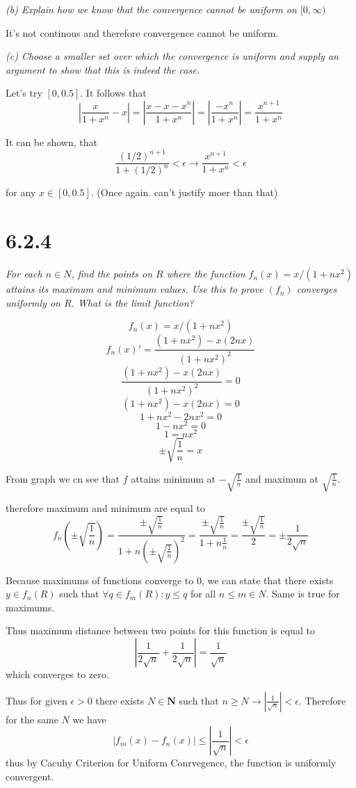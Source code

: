 \documentclass[11pt,oneside,titlepage]{book}
\begin{document}
\textit{(b) Explain how we know that the convergence cannot be uniform
  on $[0, \infty)$}

It's not continous and therefore convergence cannot be uniform.

\textit{(c) Choose a smaller set over which the convergence is uniform and
  supply an argument to show that this is indeed the case.}

Let's try $[0, 0.5]$. It follows that
$$\left|\frac{x}{1 + x^n} - x\right|  =
\left|\frac{x - x - x^n}{1 + x^n}\right|  =
\left|\frac{ - x^n}{1 + x^n}\right|  =
\frac{ x^{n + 1}}{1 + x^n} 
$$

It can be shown, that
$$\frac{ (1/2)^{n + 1}}{1 + (1/2)^n} < \epsilon \to
\frac{ x^{n + 1}}{1 + x^n} < \epsilon
$$ 

for any $x \in [0, 0.5]$. (Once again. can't justify moer than that)


\section*{6.2.4}
\textit{For each $n \in N$, find the points on $R$ where the function
  $f_n(x) = x/(1 + nx^2)$ attains its maximum and minimum values. Use this
  to prove $(f_n)$ converges uniformly on $R$. What is the limit function?}

$$f_n(x) = x/(1 + nx^2)$$
$$f_n(x)' = \frac{(1 + nx^2) - x(2nx)}{(1 + nx^2)^2}$$
$$\frac{(1 + nx^2) - x(2nx)}{(1 + nx^2)^2} = 0$$
$$(1 + nx^2) - x(2nx) = 0$$
$$1 + nx^2 - 2nx^2 = 0$$
$$1 - nx^2 = 0$$
$$1 = nx^2$$
$$\pm \sqrt{\frac{1}{n}} = x$$

From graph we cn see that $f$ attains minimum at $-\sqrt{\frac{1}{n}}$
and maximum at $\sqrt{\frac{1}{n}}$.

therefore maximum and minimum are equal to 
$$f_n(\pm \sqrt{\frac{1}{n}}) = \frac{\pm \sqrt{\frac{1}{n}}}
{1 + n(\pm \sqrt{\frac{1}{n}})^2} =
\frac{\pm \sqrt{\frac{1}{n}}} {1 + n\frac{1}{n}} =
\frac{\pm \sqrt{\frac{1}{n}}} {2} =
\pm \frac{1}{2\sqrt{n}} $$

Because maximums of functions converge to 0, we can state that
there exists $y \in f_n(R)$
such that $\forall q \in f_m(R): y \leq q$ for all $n \leq m \in N$.
Same is true for maximums. 

Thus maximum distance between two points for this function is equal to
$$| \frac{1}{2\sqrt{n}} + \frac{1}{2\sqrt{n}}| = \frac{1}{\sqrt{n}}$$
which converges to zero.

Thus for given $\epsilon > 0$ there exists $N \in \textbf{N}$ such that
$n \geq N \to |\frac{1}{\sqrt{n}}| < \epsilon$. Therefore for the same
$N$ we have
$$|f_m(x) - f_n(x)| \leq |\frac{1}{\sqrt{n}}| < \epsilon$$
thus by Cacuhy Criterion for Uniform Conrvegence, the function  is
uniformly convergent.
\end{document}
